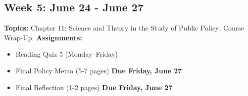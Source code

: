 \documentclass[11pt, letterpaper]{article}
\begin{document}
\subsection*{Week 5: June 24 - June 27}
\textbf{Topics:} \newline
Chapter 11: Science and Theory in the Study of Public Policy; Course Wrap-Up.\newline
\textbf{Assignments:} \begin{itemize}
  \item Reading Quiz 5 (Monday--Friday)
  \item Final Policy Memo (5-7 pages) \textbf{Due Friday, June 27}
  \item Final Reflection (1-2 pages) \textbf{Due Friday, June 27}
\end{itemize}
\end{document}
